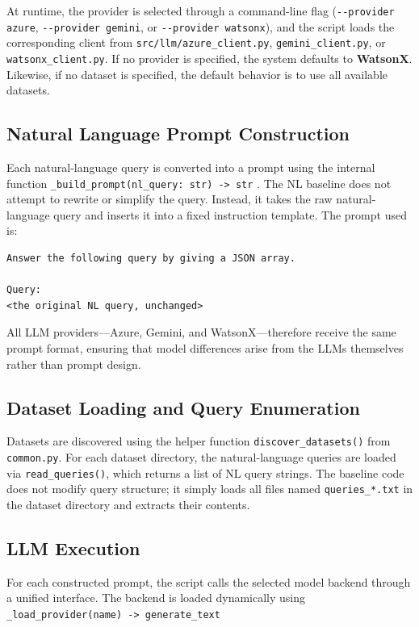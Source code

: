 \documentclass[12pt]{article}
\begin{document}
At runtime, the provider is selected through a command-line flag 
(\verb|--provider azure|, \verb|--provider gemini|, or \verb|--provider watsonx|),
and the script loads the corresponding client from 
\texttt{src/llm/azure\_client.py}, \texttt{gemini\_client.py}, or 
\texttt{watsonx\_client.py}.
If no provider is specified, the system defaults to \textbf{WatsonX}.
Likewise, if no dataset is specified, the default behavior is to use all available datasets.

\subsection{Natural Language Prompt Construction}

Each natural-language query is converted into a prompt using the internal function \verb|_build_prompt(nl_query: str) -> str| .
The NL baseline does not attempt to rewrite or simplify the query.  
Instead, it takes the raw natural-language query and inserts it into a fixed instruction template.  
The prompt used is:

\begin{verbatim}
Answer the following query by giving a JSON array.

Query:
<the original NL query, unchanged>
\end{verbatim}

All LLM providers---Azure, Gemini, and WatsonX---therefore receive the same prompt format, ensuring that model differences arise from the LLMs themselves rather than prompt design.

\subsection{Dataset Loading and Query Enumeration}

Datasets are discovered using the helper function 
\texttt{discover\_datasets()} from \texttt{common.py}.  
For each dataset directory, the natural-language queries are loaded via
\texttt{read\_queries()}, which returns a list of NL query strings.  
The baseline code does not modify query structure; it simply loads all files named
\texttt{queries\_*.txt} in the dataset directory and extracts their contents.

\subsection{LLM Execution}

For each constructed prompt, the script calls the selected model backend through a unified interface.  
The backend is loaded dynamically using \verb|_load_provider(name) -> generate_text|
\end{document}
